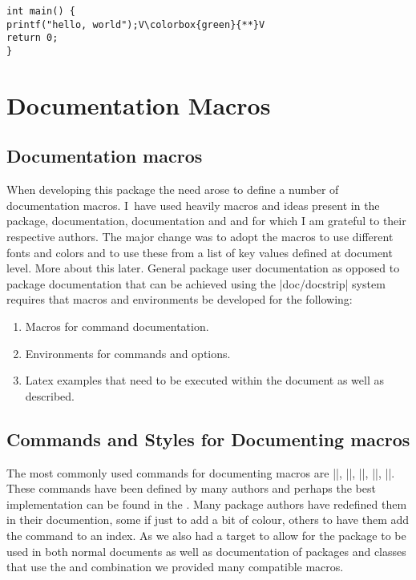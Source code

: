 \begin{lstlisting}
int main() {
printf("hello, world");V\colorbox{green}{**}V
return 0;
}
\end{lstlisting}



\chapter{Documentation Macros}


\section{Documentation macros}

When developing this package the need arose to define a number of documentation macros. I~have used heavily macros and ideas present in the  package,  documentation,  documentation  and  and for which I am grateful to their respective authors. The major change was to adopt the macros to use different fonts and colors and to use these from a list of key values defined at document level. More about this later. General package user documentation as opposed to package documentation that can be achieved using the |doc/docstrip| system requires that macros and environments be developed for the following:

\begin{enumerate}
\item Macros for command documentation.
\item Environments for commands and options.
\item Latex examples that need to be executed within the document as well as described.
\end{enumerate}


\section{Commands and Styles for Documenting macros}

The most commonly used commands for documenting macros are |\cs|, |\cmd|, |\meta|, |\marg|, |\oarg|. These commands have been defined by many authors and perhaps the best implementation can be found in the . Many package authors have redefined them in their documention, some if just to add a bit of colour, others to have them add the command to an index. As we also had a target to allow for
the package to be used in both normal documents as well as documentation
of packages and classes that use the  and  combination we provided many compatible macros.

